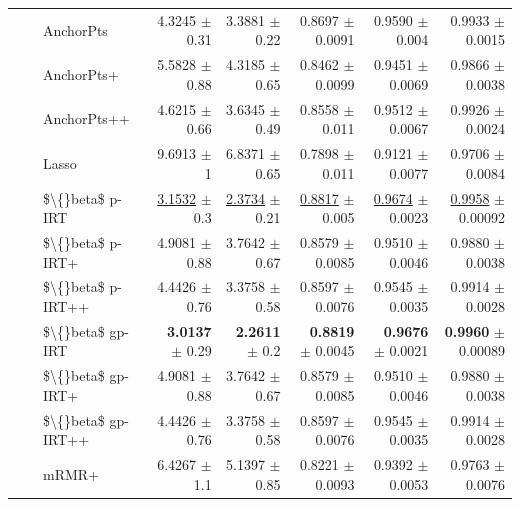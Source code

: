 \begin{longtable}{llp{}rrrrr}
 &  & AnchorPts & 4.3245 {\scriptsize $\pm$ 0.31} & 3.3881 {\scriptsize $\pm$ 0.22} & 0.8697 {\scriptsize $\pm$ 0.0091} & 0.9590 {\scriptsize $\pm$ 0.004} & 0.9933 {\scriptsize $\pm$ 0.0015} \\
 &  & AnchorPts+ & 5.5828 {\scriptsize $\pm$ 0.88} & 4.3185 {\scriptsize $\pm$ 0.65} & 0.8462 {\scriptsize $\pm$ 0.0099} & 0.9451 {\scriptsize $\pm$ 0.0069} & 0.9866 {\scriptsize $\pm$ 0.0038} \\
 &  & AnchorPts++ & 4.6215 {\scriptsize $\pm$ 0.66} & 3.6345 {\scriptsize $\pm$ 0.49} & 0.8558 {\scriptsize $\pm$ 0.011} & 0.9512 {\scriptsize $\pm$ 0.0067} & 0.9926 {\scriptsize $\pm$ 0.0024} \\
 &  & Lasso & 9.6913 {\scriptsize $\pm$ 1} & 6.8371 {\scriptsize $\pm$ 0.65} & 0.7898 {\scriptsize $\pm$ 0.011} & 0.9121 {\scriptsize $\pm$ 0.0077} & 0.9706 {\scriptsize $\pm$ 0.0084} \\
 &  & \$\textbackslash\{\}beta\$ p-IRT & \underline{3.1532} {\scriptsize $\pm$ 0.3} & \underline{2.3734} {\scriptsize $\pm$ 0.21} & \underline{0.8817} {\scriptsize $\pm$ 0.005} & \underline{0.9674} {\scriptsize $\pm$ 0.0023} & \underline{0.9958} {\scriptsize $\pm$ 0.00092} \\
 &  & \$\textbackslash\{\}beta\$ p-IRT+ & 4.9081 {\scriptsize $\pm$ 0.88} & 3.7642 {\scriptsize $\pm$ 0.67} & 0.8579 {\scriptsize $\pm$ 0.0085} & 0.9510 {\scriptsize $\pm$ 0.0046} & 0.9880 {\scriptsize $\pm$ 0.0038} \\
 &  & \$\textbackslash\{\}beta\$ p-IRT++ & 4.4426 {\scriptsize $\pm$ 0.76} & 3.3758 {\scriptsize $\pm$ 0.58} & 0.8597 {\scriptsize $\pm$ 0.0076} & 0.9545 {\scriptsize $\pm$ 0.0035} & 0.9914 {\scriptsize $\pm$ 0.0028} \\
 &  & \$\textbackslash\{\}beta\$ gp-IRT & \textbf{3.0137} {\scriptsize $\pm$ 0.29} & \textbf{2.2611} {\scriptsize $\pm$ 0.2} & \textbf{0.8819} {\scriptsize $\pm$ 0.0045} & \textbf{0.9676} {\scriptsize $\pm$ 0.0021} & \textbf{0.9960} {\scriptsize $\pm$ 0.00089} \\
 &  & \$\textbackslash\{\}beta\$ gp-IRT+ & 4.9081 {\scriptsize $\pm$ 0.88} & 3.7642 {\scriptsize $\pm$ 0.67} & 0.8579 {\scriptsize $\pm$ 0.0085} & 0.9510 {\scriptsize $\pm$ 0.0046} & 0.9880 {\scriptsize $\pm$ 0.0038} \\
 &  & \$\textbackslash\{\}beta\$ gp-IRT++ & 4.4426 {\scriptsize $\pm$ 0.76} & 3.3758 {\scriptsize $\pm$ 0.58} & 0.8597 {\scriptsize $\pm$ 0.0076} & 0.9545 {\scriptsize $\pm$ 0.0035} & 0.9914 {\scriptsize $\pm$ 0.0028} \\
 &  & mRMR+ & 6.4267 {\scriptsize $\pm$ 1.1} & 5.1397 {\scriptsize $\pm$ 0.85} & 0.8221 {\scriptsize $\pm$ 0.0093} & 0.9392 {\scriptsize $\pm$ 0.0053} & 0.9763 {\scriptsize $\pm$ 0.0076} \\

\end{longtable}
